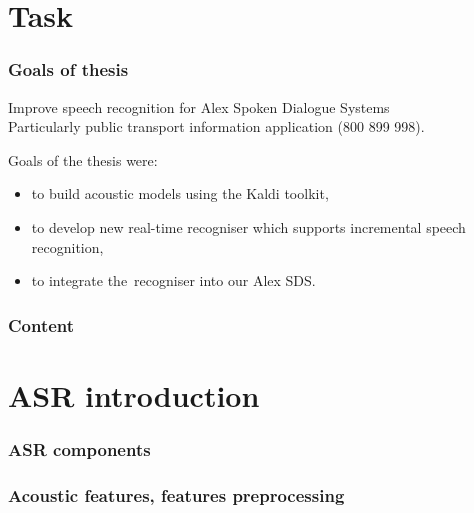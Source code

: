 

\maketitle


\section{Task} %

\begin{frame}\frametitle{Goals of thesis} 
    Improve speech recognition for Alex Spoken Dialogue Systems \\
    Particularly public transport information application (800 899 998).
    \begin{exampleblock}{Goals of the thesis were:}
        \begin{itemize}
            \item to build acoustic models using the Kaldi toolkit,
            \item to develop new real-time recogniser which supports incremental speech recognition,
            \item to integrate the~recogniser into our Alex SDS.
        \end{itemize}
    \end{exampleblock}
\end{frame}

\begin{frame} \frametitle{Content} \tableofcontents \end{frame}

\section{ASR introduction} %

\begin{frame}\frametitle{ASR components} 
    
\end{frame}

\begin{frame}\frametitle{Acoustic features, features preprocessing} 
    
    
\end{frame}

